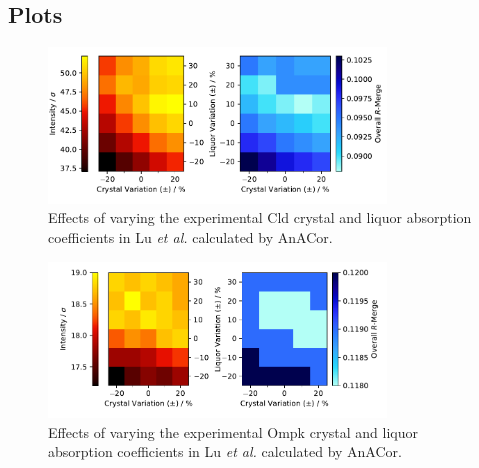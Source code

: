 \newpage
\subsection{Plots}

\begin{figure}[h]
    \centering
    \includegraphics[width = 0.8\textwidth]{plots/exp0/cld_merged_stats.pdf} 
    \caption{Effects of varying the experimental Cld crystal and liquor absorption coefficients in Lu \textit{et al.} \cite{Lu2024} calculated by AnACor.}
    \label{fig:cld_stats}
\end{figure}

\begin{figure}[h]
    \centering
    \includegraphics[width = 0.8\textwidth]{plots/exp0/ompk_merged_stats.pdf}
    \caption{Effects of varying the experimental Ompk crystal and liquor absorption coefficients in Lu \textit{et al.} \cite{Lu2024} calculated by AnACor.}
    \label{fig:ompk_stats}
\end{figure}



